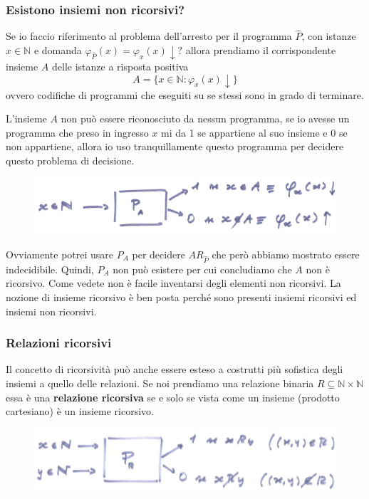 \documentclass{article}
\begin{document}
\subsubsection{Esistono insiemi non ricorsivi?}
Se io faccio riferimento al problema dell'arresto per il programma $\hat{P}$, con
istanze $x\in\mathbb{N}$ e domanda $\varphi_{\hat{P}}(x)=\varphi_x(x)\downarrow?$
allora prendiamo il corrispondente insieme $A$ delle istanze a risposta positiva
$$A=\{x\in\mathbb{N}:\varphi_x(x)\downarrow\}$$
ovvero codifiche di programmi che eseguiti su se stessi sono in grado di terminare.

L'insieme $A$ non può essere riconosciuto da nessun programma, se io avesse un programma
che preso in ingresso $x$ mi da 1 se appartiene al suo insieme e 0 se non appartiene,
allora io uso tranquillamente questo programma per decidere questo problema di decisione.
\begin{figure}[H]
    \centering
    \includegraphics[scale=0.5]{images/a_non_ric.png}
\end{figure}

Ovviamente potrei usare $P_A$ per decidere $AR_{\hat{P}}$ che però abbiamo mostrato
essere indecidibile. Quindi, $P_A$ non può esistere per cui concludiamo che $A$ non è
ricorsivo.
Come vedete non è facile inventarsi degli elementi non ricorsivi. La nozione di insieme
ricorsivo è ben posta perché sono presenti insiemi ricorsivi ed insiemi non ricorsivi.

\subsubsection{Relazioni ricorsivi}
Il concetto di ricorsività può anche essere esteso a costrutti più sofistica degli
insiemi a quello delle relazioni. Se noi prendiamo una relazione binaria $R\subseteq\mathbb{N}\times\mathbb{N}$
essa è una \textbf{relazione ricorsiva} se e solo se vista come un insieme (prodotto cartesiano) è un insieme ricorsivo.

\begin{figure}[H]
    \centering
    \includegraphics[scale=0.5]{images/rel_ricors.png}
\end{figure}
\end{document}
